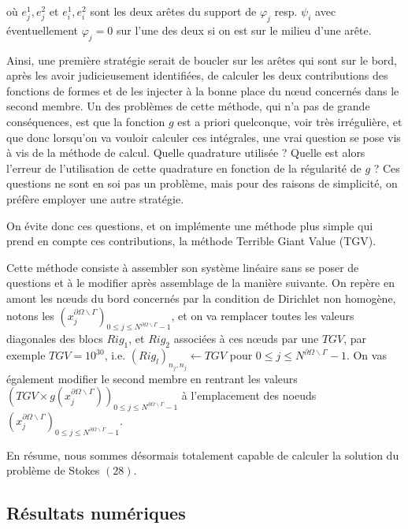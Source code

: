 \documentclass[a4paper,12pt]{article}
\begin{document}
où $e^{1}_j, e^{2}_j$ et $e^{1}_i, e^{2}_i$  sont les deux arêtes du support de $\varphi_j$ resp. $\psi_i$ avec éventuellement $\varphi_j = 0$ sur l'une des deux si on est sur le milieu d'une arête.

Ainsi, une première stratégie serait de boucler sur les arêtes qui sont sur le bord, après les avoir judicieusement identifiées, de calculer les deux contributions des fonctions de formes et de les injecter à la bonne place du nœud concernés dans le second membre.
Un des problèmes de cette méthode, qui n'a pas de grande conséquences, est que la fonction $g$ est a priori quelconque, voir très irrégulière, et que donc lorsqu'on va vouloir calculer ces intégrales, une vrai question se pose vis à vis de la méthode de calcul. Quelle quadrature utilisée ? Quelle est alors l'erreur de l'utilisation de cette quadrature en fonction de la régularité de $g$ ? Ces questions ne sont en soi pas un problème, mais pour des raisons de simplicité, on préfère employer une autre stratégie.

On évite donc ces questions, et on implémente une méthode plus simple qui prend en compte ces contributions, la méthode Terrible Giant Value (TGV).

Cette méthode consiste à assembler son système linéaire sans se poser de questions et à le modifier après assemblage de la manière suivante. On repère en amont les nœuds du bord concernés par la condition de Dirichlet non homogène, notons les $\left( x^{\partial \Omega \backslash \Gamma}_j \right)_{0 \leq j \leq N^{\partial \Omega \backslash \Gamma} -1 }$, et on va remplacer toutes les valeurs diagonales des blocs $Rig_1$, et $Rig_2$ associées à ces nœuds par une $TGV$, par exemple $TGV = 10^{30}$, i.e. $(Rig_l)_{n_j,n_j} \longleftarrow TGV $ pour $ 0\leq j \leq N^{\partial \Omega \backslash \Gamma} -1 $. On vas également modifier le second membre en rentrant les valeurs $\left( TGV \times g \left( x^{\partial \Omega \backslash \Gamma}_j \right) \right)_{0 \leq j \leq N^{\partial \Omega \backslash \Gamma} -1 }$ à l'emplacement des noeuds $\left( x^{\partial \Omega \backslash \Gamma}_j \right)_{0 \leq j \leq N^{\partial \Omega \backslash \Gamma} -1 }$.

En résume, nous sommes désormais totalement capable de calculer la solution du problème de Stokes $(28)$.

\subsection{Résultats numériques}
\end{document}

